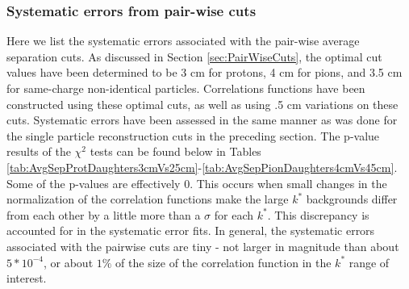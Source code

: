 \subsubsection{Systematic errors from pair-wise cuts}
\label{sec:SystematicsPairWise}

Here we list the systematic errors associated with the pair-wise average separation cuts.  
As discussed in Section \ref{sec:PairWiseCuts}, the optimal cut values have been determined to be 3 cm for protons, 4 cm for pions, and 3.5 cm for same-charge non-identical particles.  
Correlations functions have been constructed using these optimal cuts, as well as using .5 cm variations on these cuts.  
Systematic errors have been assessed in the same manner as was done for the single particle reconstruction cuts in the preceding section.  
The p-value results of the $\chi^2$ tests can be found below in Tables \ref{tab:AvgSepProtDaughters3cmVs25cm}-\ref{tab:AvgSepPionDaughters4cmVs45cm}.  
Some of the p-values are effectively 0.  
This occurs when small changes in the normalization of the correlation functions make the large $k^*$ backgrounds differ from each other by a little more than a $\sigma$ for each $k^*$.  
This discrepancy is accounted for in the systematic error fits. 
In general, the systematic errors associated with the pairwise cuts are tiny - not larger in magnitude than about $5*10^{-4}$, or about $1\%$ of the size of the correlation function in the $k^*$ range of interest.  

